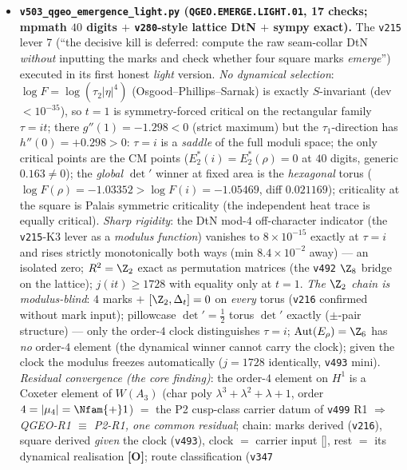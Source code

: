 \documentclass[11pt]{article}
\providecommand{\mO}{\textbf{[O]}}\providecommand{\mX}{\textbf{[X]}}
\begin{document}
\begin{itemize}[leftmargin=1.5em]
\item \textbf{\texttt{v503\_qgeo\_emergence\_light.py} (\texttt{QGEO.EMERGE.LIGHT.01}, 17 checks;
mpmath $40$ digits $+$ \texttt{v280}-style lattice DtN $+$ sympy exact).} The \texttt{v215} lever 7
(``the decisive kill is deferred: compute the raw seam-collar DtN \emph{without} inputting the marks
and check whether four square marks \emph{emerge}'') executed in its first honest \emph{light}
version. \emph{No dynamical selection}: $\log F=\log(\tau_2|\eta|^4)$ (Osgood--Phillips--Sarnak) is
exactly $S$-invariant (dev $<10^{-35}$), so $t{=}1$ is symmetry-forced critical on the rectangular
family $\tau=it$; there $g''(1)=-1.298<0$ (strict maximum) but the $\tau_1$-direction has
$h''(0)=+0.298>0$: $\tau{=}i$ is a \emph{saddle} of the full moduli space; the only critical points
are the CM points ($E_2^*(i)=E_2^*(\rho)=0$ at $40$ digits, generic $0.163\neq0$); the \emph{global}
$\det{}'$ winner at fixed area is the \emph{hexagonal} torus ($\log F(\rho)=-1.03352>\log
F(i)=-1.05469$, diff $0.021169$); criticality at the square is Palais symmetric criticality (the
independent heat trace is equally critical). \emph{Sharp rigidity}: the DtN mod-$4$ off-character
indicator (the \texttt{v215}-K3 lever as a \emph{modulus function}) vanishes to $8\times10^{-15}$
exactly at $\tau{=}i$ and rises strictly monotonically both ways (min $8.4\times10^{-2}$ away) ---
an isolated zero; $R^2=\Z_2$ exact as permutation matrices (the \texttt{v492} $\Z_8$ bridge on the
lattice); $j(it)\ge1728$ with equality only at $t{=}1$. \emph{The $\Z_2$ chain is modulus-blind}:
$4$ marks $+$ $[\Z_2,\Delta_t]=0$ on \emph{every} torus (\texttt{v216} confirmed without mark
input); pillowcase $\det{}'=\tfrac12$ torus $\det{}'$ exactly ($\pm$-pair structure) --- only the
order-$4$ clock distinguishes $\tau{=}i$; $\mathrm{Aut}(E_\rho)=\Z_6$ has \emph{no} order-$4$
element (the dynamical winner cannot carry the clock); given the clock the modulus freezes
automatically ($j=1728$ identically, \texttt{v493} mini). \emph{Residual convergence (the core
finding)}: the order-$4$ element on $H^1$ is a Coxeter element of $W(A_3)$ (char poly
$\lambda^3{+}\lambda^2{+}\lambda{+}1$, order $4=|\mu_4|=\Nfam{+}1$) $=$ the P2 cusp-class carrier
datum of \texttt{v499} R1 $\Rightarrow$ \emph{QGEO-R1 $\equiv$ P2-R1, one common residual}; chain:
marks derived (\texttt{v216}), square derived \emph{given} the clock (\texttt{v493}), clock $=$
carrier input [\mC], rest $=$ its dynamical realisation \mO; route classification (\texttt{v347}

\end{itemize}
\end{document}
